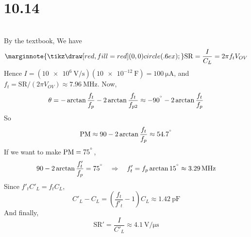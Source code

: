 \documentclass[12pt, a4paper]{article}
\newcommand{\tikzcircle}{\tikz\draw[red,fill=red] (0,0) circle (.6ex);}%
\newcommand{\important}{\marginnote{\tikzcircle}}
\begin{document}
\section{10.14}
\Ans \\
By the textbook, We have
\begin{equation*}
  \important \mathrm{SR} = \frac{I}{C_L} = 2 \pi f_t V_{OV}
\end{equation*}
Hence $I = (\SI{10e6}{\V \per \second}) (\SI{10e-12}{\farad}) = \SI{100}\uA$, 
and $f_t = \mathrm{SR} / (2 \pi V_{OV}) \approx \SI{7.96}\MHz$.
Now, 
\[ \theta = - \arctan \frac{f_t}{f_p} - 2 \arctan \frac{f_t}{f_{p2}} 
\approx -90^{^\circ} - 2\arctan \frac{f_t}{f_p} \]
So
\[ \textrm{PM} \approx 90 - 2 \arctan \frac{f_t}{f_p} \approx 54.7^{^\circ} \]
If we want to make $\textrm{PM} = 75^{^\circ}$, 
\[ 90 - 2 \arctan \frac{f'_t}{f_p} = 75^{\degree} \quad \Rightarrow \quad 
f'_t = f_p \arctan 15^{\degree} \approx \SI{3.29}\MHz \]
Since $f'_t C'_L = f_t C_L$, 
\[ C'_L - C_L = \left( \frac{f_t}{f'_t} - 1 \right) C_L \approx \SI{1.42}{\pico \farad} \]
And finally,
\[ \textrm{SR}' = \frac{I}{C'_L} \approx \SI{4.1}{\V \per \micro \second} \]
\end{document}
